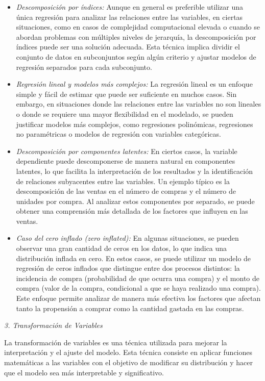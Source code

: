 \documentclass[
]{book}
\begin{document}
\begin{itemize}
\item
  \emph{Descomposición por índices:} Aunque en general es preferible
  utilizar una única regresión para analizar las relaciones entre las
  variables, en ciertas situaciones, como en casos de complejidad
  computacional elevada o cuando se abordan problemas con múltiples
  niveles de jerarquía, la descomposición por índices puede ser una
  solución adecuada. Esta técnica implica dividir el conjunto de datos
  en subconjuntos según algún criterio y ajustar modelos de regresión
  separados para cada subconjunto.
\item
  \emph{Regresión lineal y modelos más complejos:} La regresión lineal es
  un enfoque simple y fácil de estimar que puede ser suficiente en
  muchos casos. Sin embargo, en situaciones donde las relaciones entre
  las variables no son lineales o donde se requiere una mayor
  flexibilidad en el modelado, se pueden justificar modelos más
  complejos, como regresiones polinómicas, regresiones no paramétricas
  o modelos de regresión con variables categóricas.
\item
  \emph{Descomposición por componentes latentes:} En ciertos casos, la
  variable dependiente puede descomponerse de manera natural en
  componentes latentes, lo que facilita la interpretación de los
  resultados y la identificación de relaciones subyacentes entre las
  variables. Un ejemplo típico es la descomposición de las ventas en
  el número de compras y el número de unidades por compra. Al analizar
  estos componentes por separado, se puede obtener una comprensión más
  detallada de los factores que influyen en las ventas.
\item
  \emph{Caso del cero inflado (zero inflated):} En algunas situaciones, se
  pueden observar una gran cantidad de ceros en los datos, lo que
  indica una distribución inflada en cero. En estos casos, se puede
  utilizar un modelo de regresión de ceros inflados que distingue
  entre dos procesos distintos: la incidencia de compra (probabilidad
  de que ocurra una compra) y el monto de compra (valor de la compra,
  condicional a que se haya realizado una compra). Este enfoque
  permite analizar de manera más efectiva los factores que afectan
  tanto la propensión a comprar como la cantidad gastada en las
  compras.
\end{itemize}

\emph{3. Transformación de Variables}

La transformación de variables es una técnica utilizada para mejorar la
interpretación y el ajuste del modelo. Esta técnica consiste en aplicar
funciones matemáticas a las variables con el objetivo de modificar su
distribución y hacer que el modelo sea más interpretable y
significativo.
\end{document}
